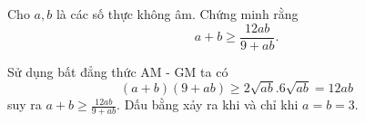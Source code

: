 \begin{problem}
	Cho $a, b$ là các số thực không âm. Chứng minh rằng
	\[
		a + b \ge \frac{12ab}{9 + ab}.
	\]
	\solution

	Sử dụng bất đẳng thức AM - GM ta có
	\[
		(a + b)(9 + ab) \ge 2\sqrt{ab} . 6\sqrt{ab} = 12ab
	\]
	suy ra $\displaystyle a + b \ge \frac{12ab}{9 + ab}$. Dấu bằng xảy ra khi và chỉ khi $a = b = 3$.
\end{problem}